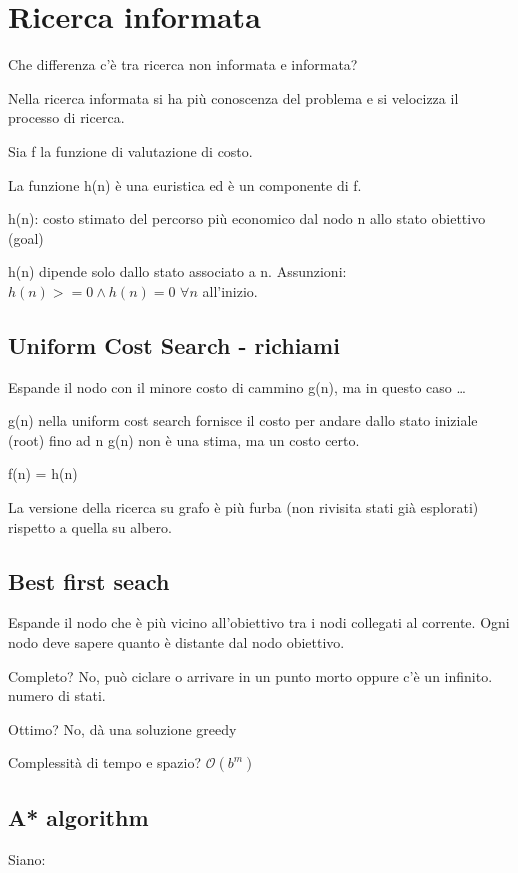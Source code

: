 \newpage

\section{Ricerca informata}

Che differenza c'è tra ricerca non informata e informata?

Nella ricerca informata si ha più conoscenza del problema e si
velocizza il processo di ricerca.

Sia f la funzione di valutazione di costo.

La funzione h(n) è una euristica ed è un componente di f.

h(n): costo stimato del percorso più economico dal nodo n allo stato
obiettivo (goal)

h(n) dipende solo dallo stato associato a n.
Assunzioni: $h(n) >= 0 \land h(n) = 0$ $\forall n$ all'inizio.

\subsection{Uniform Cost Search - richiami}
Espande il nodo con il minore costo di cammino g(n), ma in questo caso \dots

g(n) nella uniform cost search fornisce il costo per andare dallo stato
iniziale (root) fino ad n g(n) non è una stima, ma un costo certo.

f(n) = h(n)

La versione della ricerca su grafo è più furba (non rivisita stati già esplorati)
rispetto a quella su albero. 

\subsection{Best first seach}
Espande il nodo che è più vicino all'obiettivo tra i nodi collegati al corrente.
Ogni nodo deve sapere quanto è distante dal nodo obiettivo.

Completo? No, può ciclare o arrivare in un punto morto oppure c'è un infinito.
numero di stati.

Ottimo? No, dà una soluzione greedy

Complessità di tempo e spazio? $\mathcal{O}(b^m)$

\subsection{A* algorithm}

Siano:

